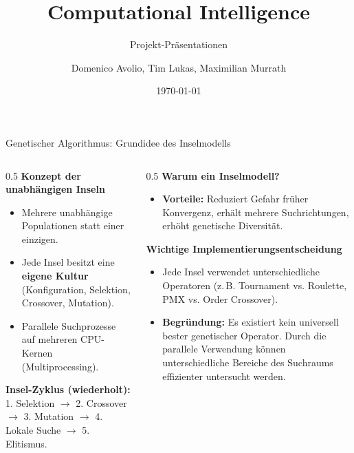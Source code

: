 \documentclass[aspectratio=169]{beamer}
\title{Computational Intelligence}
\subtitle{Projekt-Präsentationen}
\author{Domenico Avolio, Tim Lukas, Maximilian Murrath}
\institute{Hochschule für Technik Stuttgart \\ Wirtschaftsinformatik}
\date{\today}
\begin{document}
\begin{frame}[plain]
\titlepage
\end{frame}

\begin{frame}{Genetischer Algorithmus: Grundidee des Inselmodells}
\begin{columns}[T]
\footnotesize
\begin{column}{0.5\textwidth}
\textbf{Konzept der unabhängigen Inseln}
\begin{itemize}
    \item Mehrere unabhängige Populationen statt einer einzigen.
    \item Jede Insel besitzt eine \textbf{eigene Kultur} (Konfiguration, Selektion, Crossover, Mutation).
    \item Parallele Suchprozesse auf mehreren CPU-Kernen (Multiprocessing).
\end{itemize}
\textbf{Insel-Zyklus (wiederholt):} 1. Selektion $\rightarrow$ 2. Crossover $\rightarrow$ 3. Mutation $\rightarrow$ 4. Lokale Suche $\rightarrow$ 5. Elitismus.
\end{column}

\begin{column}{0.5\textwidth}
\textbf{Warum ein Inselmodell?}
\begin{itemize}
    \item \textcolor{HFTTeal}{\textbf{Vorteile:}} Reduziert Gefahr früher Konvergenz, erhält mehrere Suchrichtungen, erhöht genetische Diversität.
\end{itemize}
\textbf{Wichtige Implementierungsentscheidung}
\begin{itemize}
    \item Jede Insel verwendet unterschiedliche Operatoren (z.\,B. Tournament vs. Roulette, PMX vs. Order Crossover).
    \item \textcolor{HFTTeal}{\textbf{Begründung:}} Es existiert kein universell bester genetischer Operator. Durch die parallele Verwendung können unterschiedliche Bereiche des Suchraums effizienter untersucht werden.
\end{itemize}
\end{column}
\end{columns}
\end{frame}
\end{document}
